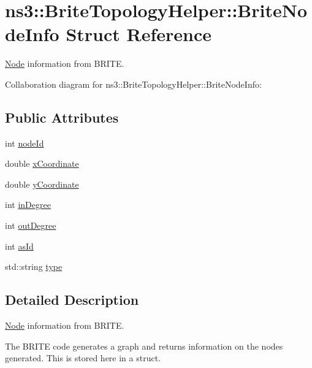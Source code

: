 \hypertarget{structns3_1_1BriteTopologyHelper_1_1BriteNodeInfo}{}\section{ns3\+:\+:Brite\+Topology\+Helper\+:\+:Brite\+Node\+Info Struct Reference}
\label{structns3_1_1BriteTopologyHelper_1_1BriteNodeInfo}


\hyperlink{classns3_1_1Node}{Node} information from B\+R\+I\+TE.  




Collaboration diagram for ns3\+:\+:Brite\+Topology\+Helper\+:\+:Brite\+Node\+Info\+:
\subsection*{Public Attributes}
\begin{DoxyCompactItemize}
\item 
int \hyperlink{structns3_1_1BriteTopologyHelper_1_1BriteNodeInfo_ac06d9e993e0880c670bf5bd0b5d9315a}{node\+Id}
\item 
double \hyperlink{structns3_1_1BriteTopologyHelper_1_1BriteNodeInfo_a8b252b163e2837658dbf7b4b66cc848b}{x\+Coordinate}
\item 
double \hyperlink{structns3_1_1BriteTopologyHelper_1_1BriteNodeInfo_ab35e072f7b247b4b4ae4e24992fbaac4}{y\+Coordinate}
\item 
int \hyperlink{structns3_1_1BriteTopologyHelper_1_1BriteNodeInfo_a5cd950a8ea386a8f191a389c9fe5ef10}{in\+Degree}
\item 
int \hyperlink{structns3_1_1BriteTopologyHelper_1_1BriteNodeInfo_a51e75d03eaec9066e4bdbc04f8722000}{out\+Degree}
\item 
int \hyperlink{structns3_1_1BriteTopologyHelper_1_1BriteNodeInfo_ac5982d2423fdc94afaff75e44cd618db}{as\+Id}
\item 
std\+::string \hyperlink{structns3_1_1BriteTopologyHelper_1_1BriteNodeInfo_a95d9b18e9d538773193ce6207099f4bd}{type}
\end{DoxyCompactItemize}


\subsection{Detailed Description}
\hyperlink{classns3_1_1Node}{Node} information from B\+R\+I\+TE. 

The B\+R\+I\+TE code generates a graph and returns information on the nodes generated. This is stored here in a struct. 

